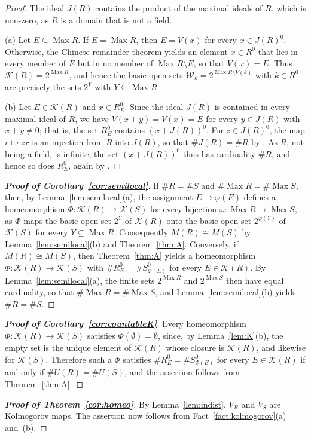 \documentclass[12pt,reqno,a4paper]{amsart}
\newcommand{\K}{\mathcal{K}}
\newcommand{\W}{\mathcal{W}}
\DeclareMathOperator{\Max}{Max}
\theoremstyle{plain}
\theoremstyle{definition}
\begin{document}
\begin{proof}
The ideal $J(R)$ contains the product of the maximal ideals of $R$, which is non-zero, as $R$ is a domain that is not a field.

(a) Let $E\subseteq\Max R$. If $E=\Max R$, then $E=V(x)$ for every $x\in J(R)^0$. Otherwise, the Chinese remainder theorem \cite[Proposition~1.10(ii)]{AtiyahMacdonald} yields an element $x\in R^0$ that lies in every member of $E$ but in no member of $\Max R\setminus E$, so that $V(x)=E$. Thus $\K(R)=2^{\Max R}$, and hence the basic open sets $\W_k=2^{\Max R\setminus V(k)}$ with $k\in R^0$ are precisely the sets $2^Y$ with $Y\subseteq\Max R$.

(b) Let $E\in\K(R)$ and $x\in R^0_E$. Since the ideal $J(R)$ is contained in every maximal ideal of $R$, we have $V(x+y)=V(x)=E$ for every $y\in J(R)$ with $x+y\neq0$; that is, the set $R^0_E$ contains $(x+J(R))^0$. For $z\in J(R)^0$, the map $r\mapsto zr$ is an injection from $R$ into $J(R)$, so that $\#J(R)=\#R$ by \cite[Theorem~3.2]{Jech}. As $R$, not being a field, is infinite, the set $(x+J(R))^0$ thus has cardinality $\#R$, and hence so does $R^0_E$, again by \cite[Theorem~3.2]{Jech}.
\end{proof}
\begin{proof}[\normalfont\bfseries Proof of Corollary~\ref{cor:semilocal}]
If $\#R=\#S$ and $\#{\Max R}=\#{\Max S}$, then, by Lemma~\ref{lem:semilocal}(a), the assignment $E\mapsto\varphi(E)$ defines a homeomorphism $\Phi\colon\K(R)\to\K(S)$ for every bijection $\varphi\colon\Max R\to\Max S$, as $\Phi$ maps the basic open set $2^Y$ of $\K(R)$ onto the basic open set $2^{\varphi(Y)}$ of $\K(S)$ for every $Y\subseteq\Max R$. Consequently $M(R)\cong M(S)$ by Lemma~\ref{lem:semilocal}(b) and Theorem~\ref{thm:A}. Conversely, if $M(R)\cong M(S)$, then Theorem~\ref{thm:A} yields a homeomorphism $\Phi\colon\K(R)\to\K(S)$ with $\#R^0_E=\#S^0_{\Phi(E)}$ for every $E\in\K(R)$. By Lemma~\ref{lem:semilocal}(a), the finite sets $2^{\Max R}$ and $2^{\Max S}$ then have equal cardinality, so that $\#{\Max R}=\#{\Max S}$, and Lemma~\ref{lem:semilocal}(b) yields $\#R=\#S$.
\end{proof}
\begin{proof}[\normalfont\bfseries Proof of Corollary~\ref{cor:countableK}]
Every homeomorphism $\Phi\colon\K(R)\to\K(S)$ satisfies $\Phi(\emptyset)=\emptyset$, since, by Lemma~\ref{lem:K}(b), the empty set is the unique element of $\K(R)$ whose closure is $\K(R)$, and likewise for $\K(S)$. Therefore such a $\Phi$ satisfies $\#R^0_E=\#S^0_{\Phi(E)}$ for every $E\in\K(R)$ if and only if $\#U(R)=\#U(S)$, and the assertion follows from Theorem~\ref{thm:A}.
\end{proof}
\begin{proof}[\normalfont\bfseries Proof of Theorem~\ref{cor:homeo}]
By Lemma~\ref{lem:indist}, $V_R$ and $V_S$ are Kolmogorov maps. The assertion now follows from Fact~\ref{fact:kolmogorov}(a) and~(b).
\end{proof}
\end{document}
